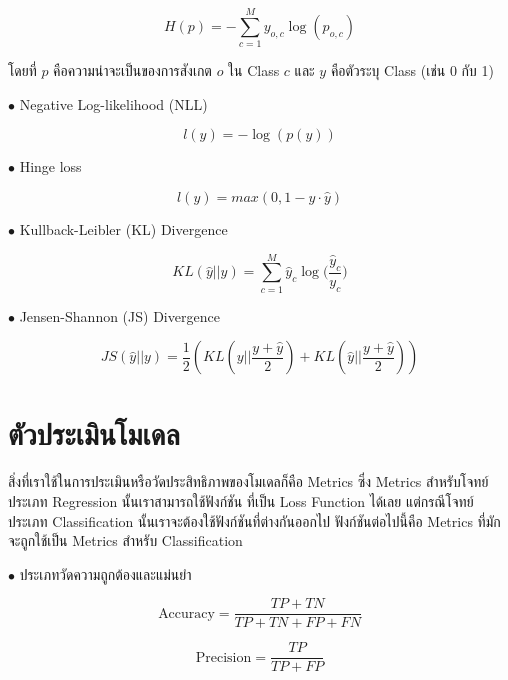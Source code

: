 \begin{equation}
    H(p) = -\sum_{c=1}^My_{o,c}\log(p_{o,c})
\end{equation}


\noindent โดยที่ $p$ คือความน่าจะเป็นของการสังเกต $o$ ใน Class $c$ และ $y$ คือตัวระบุ Class (เช่น 0 กับ 1)

\noindent $\bullet$ Negative Log-likelihood (NLL)

\begin{equation}
    l(y) = -{\log(p(y))}
\end{equation}

\noindent $\bullet$ Hinge loss

\begin{equation}
    l(y) = max(0, 1 - y \cdot \hat{y})
\end{equation}

\noindent $\bullet$ Kullback-Leibler (KL) Divergence

\begin{equation}
    KL(\hat{y} || y) = \sum_{c=1}^{M}\hat{y}_c \log \bigg( {\frac{\hat{y}_c}{y_c}} \bigg)
\end{equation}

\noindent $\bullet$ Jensen-Shannon (JS) Divergence

\begin{equation}
    JS(\hat{y} || y) = \frac{1}{2}(KL(y||\frac{y+\hat{y}}{2}) + KL(\hat{y}||\frac{y+\hat{y}}{2}))
\end{equation}

\section{ตัวประเมินโมเดล}
\label{sec:metrics}

สิ่งที่เราใช้ในการประเมินหรือวัดประสิทธิภาพของโมเดลก็คือ Metrics ซึ่ง Metrics สำหรับโจทย์ประเภท Regression นั้นเราสามารถใช้ฟังก์ชัน%
ที่เป็น Loss Function ได้เลย แต่กรณีโจทย์ประเภท Classification นั้นเราจะต้องใช้ฟังก์ชันที่ต่างกันออกไป ฟังก์ชันต่อไปนี้คือ Metrics 
ที่มักจะถูกใช้เป็น Metrics สำหรับ Classification

\noindent $\bullet$ ประเภทวัดความถูกต้องและแม่นยำ

\begin{equation}
    \text{Accuracy} = \frac{TP+TN}{TP+TN+FP+FN}
\end{equation}

\begin{equation}
    \text{Precision} = \frac{TP}{TP+FP}
\end{equation}

